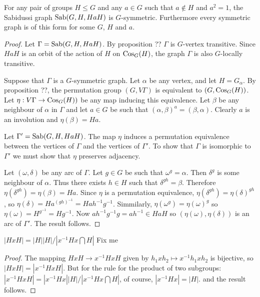 \begin{theorem} [Lorimer] For any pair of groups $H \leq G$ and any $a \in G$
such that $a \not\in H$ and $a^2 = 1$, the Sabidussi graph
$\operatorname{Sab}(G,H,HaH)$ is $G$-symmetric. Furthermore every symmetric graph
is of this form for some $G$, $H$ and $a$.
\begin{proof} 
Let $\Gamma = \operatorname{Sab}(G,H,HaH)$.
By proposition ?? $\Gamma$ is $G$-vertex transitive.
Since $HaH$ is an orbit of the action of $H$
on $\operatorname{Cos}_G(H)$, the graph $\Gamma$ is also $G$-locally transitive.

Suppose that $\Gamma$ is a $G$-symmetric graph.
Let $\alpha$ be any vertex, and let $H = G_\alpha$.
By proposition ??, the permutation group $(G, V \Gamma)$ 
is equivalent to $(G, \operatorname{Cos}_G(H))$.
Let $\eta : V \Gamma \to \operatorname{Cos}_G(H))$ be any map
inducing this equivalence.
Let $\beta$ be any neighbour of $\alpha$ in $\Gamma$
and let $a \in G$ be such that $(\alpha,\beta)^a = (\beta,\alpha)$.
Clearly $a$ is an involution and $\eta(\beta) = Ha$.

Let $\Gamma' = \operatorname{Sab}(G,H,HaH)$.
The map $\eta$ induces a permutation equivalence
between the vertices of $\Gamma$ and the vertices of $\Gamma'$.
To show that $\Gamma$ is isomorphic to $\Gamma'$
we must show that $\eta$ preserves adjacency.

Let $(\omega, \delta)$ be any arc of $\Gamma$.
Let $g \in G$ be such that $\omega^g = \alpha$.
Then $\delta^g$ is some neighbour of $\alpha$.
Thus there exists $h \in H$ such that $\delta^{gh} = \beta$.
Therefore $\eta(\delta^{gh}) = \eta(\beta) = Ha$.
Since $\eta$ is a permutation equivalence,
$\eta(\delta^{gh}) = \eta(\delta)^{gh}$,
so $\eta(\delta) = Ha^{{(gh)}^{-1}} = Hah^{-1}g^{-1}$.
Simmilarly, $\eta(\omega^g) = \eta(\omega)^g$
so $\eta(\omega) = H^{g^{-1}} = Hg^{-1}$.
Now $ah^{-1}g^{-1}g = ah^{-1} \in HaH$
so $(\eta(\omega),\eta(\delta))$ is an arc of $\Gamma'$.
The result follows.



\end{proof}
\end{theorem}


\begin{lemma}
$|HxH| = |H||H|/|x^{-1}Hx \bigcap H|$ Fix me
\begin{proof}
The mapping $HxH \to x^{-1}HxH$ given by $h_1 x h_2 \mapsto x^{-1} h_1 x h_2$
      is bijective, so $|HxH| = |x^{-1}HxH|$. 
      But for the rule for the product of two subgroups: 
      $|x^{-1}HxH| = |x^{-1}Hx||H|/|x^{-1}Hx \bigcap H|$,
      of course, $|x^{-1}Hx| = |H|$. and the result follows.
\end{proof}
\end{lemma}

